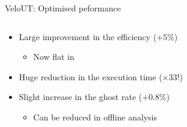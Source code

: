 \documentclass[aspectratio=1610]{beamer}
\begin{document}
\begin{frame}{VeloUT: Optimised peformance}

\begin{columns}
\begin{column}{0.65\textwidth}
\begin{itemize}
  \item Large improvement in the efficiency ($+5$\%)
  \begin{itemize}
    \item[\ding{70}] Now flat in \ptot
  \end{itemize}
  \item Huge reduction in the execution time ($\times$33!)
  \item Slight increase in the ghost rate ($+0.8$\%)
  \begin{itemize}
    \item[\ding{70}] Can be reduced in offline analysis
  \end{itemize}
\end{itemize}

\bigskip

\begin{mdframed}[linecolor=barcolor]
\begin{center}
\end{center}
\end{mdframed}
\end{column}


\end{columns}
\end{frame}
\end{document}
